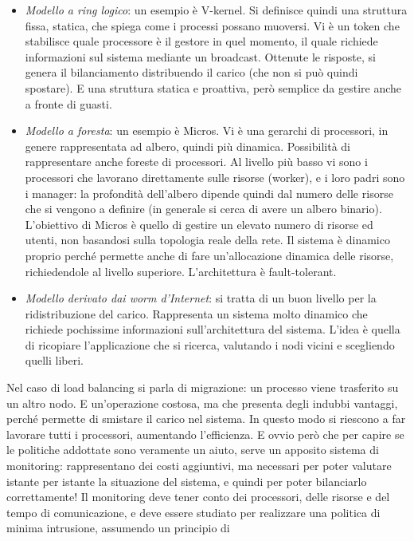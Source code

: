 \begin{itemize}
 \item \textit{Modello a ring logico}: un esempio è V-kernel. Si definisce quindi una struttura fissa, statica, che
 spiega come i processi possano muoversi. Vi è un token che stabilisce quale processore è il gestore in quel momento, il
 quale richiede informazioni sul sistema mediante un broadcast. Ottenute le risposte, si genera il bilanciamento
 distribuendo il carico (che non si può quindi spostare). E una struttura statica e proattiva, però semplice da gestire
 anche a fronte di guasti.
 \item \textit{Modello a foresta}: un esempio è Micros. Vi è una gerarchi di processori, in genere rappresentata ad
 albero, quindi più dinamica. Possibilità di rappresentare anche foreste di processori. Al livello più basso vi sono i
 processori che lavorano direttamente sulle risorse (worker), e i loro padri sono i manager: la profondità dell'albero
 dipende quindi dal numero delle risorse che si vengono a definire (in generale si cerca di avere un albero binario).
 L'obiettivo di Micros è quello di gestire un elevato numero di risorse ed utenti, non basandosi sulla topologia reale
 della rete. Il sistema è dinamico proprio perché permette anche di fare un'allocazione dinamica delle risorse,
 richiedendole al livello superiore. L'architettura è fault-tolerant.
 \item \textit{Modello derivato dai worm d'Internet}: si tratta di un buon livello per la ridistribuzione del carico.
Rappresenta  un sistema molto dinamico che richiede pochissime informazioni sull'architettura del sistema. L'idea è
quella di  ricopiare l'applicazione che si ricerca, valutando i nodi vicini e scegliendo quelli liberi.
\end{itemize}
Nel caso di load balancing si parla di migrazione: un processo viene trasferito su un altro nodo. E un'operazione
costosa, ma che presenta degli indubbi vantaggi, perché permette di smistare il carico nel sistema. In questo modo si
riescono a far lavorare tutti i processori, aumentando l'efficienza.
E ovvio però che per capire se le politiche addottate sono veramente un aiuto, serve un apposito sistema di monitoring:
rappresentano dei costi aggiuntivi, ma necessari per poter valutare istante per istante la situazione del sistema, e
quindi per poter bilanciarlo correttamente! Il monitoring deve tener conto dei processori, delle risorse e del tempo di
comunicazione, e deve essere studiato per realizzare una politica di minima intrusione, assumendo un principio di
